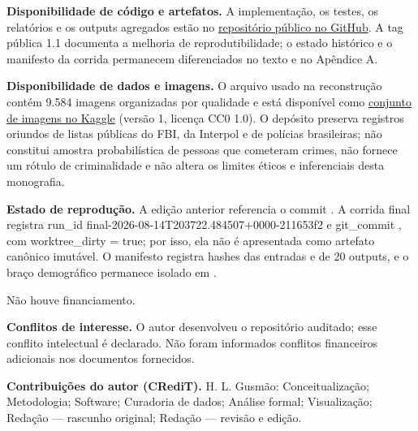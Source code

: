 \begin{declarations}

\textbf{Disponibilidade de código e artefatos.} A implementação, os testes, os relatórios e os outputs agregados estão no \uline{repositório público no GitHub}. A tag pública 1.1 documenta a melhoria de reprodutibilidade; o estado histórico e o manifesto da corrida permanecem diferenciados no texto e no Apêndice A.

\textbf{Disponibilidade de dados e imagens.} O arquivo usado na reconstrução contém 9.584 imagens organizadas por qualidade e está disponível como \uline{conjunto de imagens no Kaggle} (versão 1, licença CC0 1.0). O depósito preserva registros oriundos de listas públicas do FBI, da Interpol e de polícias brasileiras; não constitui amostra probabilística de pessoas que cometeram crimes, não fornece um rótulo de criminalidade e não altera os limites éticos e inferenciais desta monografia.

\textbf{Estado de reprodução.} A edição anterior referencia o commit . A corrida final registra run\_id final-2026-08-14T203722.484507+0000-211653f2 e git\_commit , com worktree\_dirty = true; por isso, ela não é apresentada como artefato canônico imutável. O manifesto registra hashes das entradas e de 20 outputs, e o braço demográfico permanece isolado em .

Não houve financiamento.

\textbf{Conflitos de interesse.} O autor desenvolveu o repositório auditado; esse conflito intelectual é declarado. Não foram informados conflitos financeiros adicionais nos documentos fornecidos.

\textbf{Contribuições do autor (CRediT).} H. L. Gusmão: Conceitualização; Metodologia; Software; Curadoria de dados; Análise formal; Visualização; Redação --- rascunho original; Redação --- revisão e edição.


\end{declarations}
